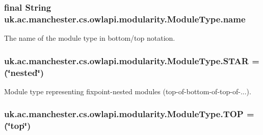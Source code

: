 \hypertarget{enumuk_1_1ac_1_1manchester_1_1cs_1_1owlapi_1_1modularity_1_1_module_type_a44198db5f341f357b3d0011c09abb6b6}{
\subsubsection[{name}]{\setlength{\rightskip}{0pt plus 5cm}final String uk.\-ac.\-manchester.\-cs.\-owlapi.\-modularity.\-Module\-Type.\-name\hspace{0.3cm}{\ttfamily [private]}}}\label{enumuk_1_1ac_1_1manchester_1_1cs_1_1owlapi_1_1modularity_1_1_module_type_a44198db5f341f357b3d0011c09abb6b6}
The name of the module type in bottom/top notation. \hypertarget{enumuk_1_1ac_1_1manchester_1_1cs_1_1owlapi_1_1modularity_1_1_module_type_a2bb705a4bb506642d6278fcbd3a2c3a4}{
\subsubsection[{S\-T\-A\-R}]{\setlength{\rightskip}{0pt plus 5cm}uk.\-ac.\-manchester.\-cs.\-owlapi.\-modularity.\-Module\-Type.\-S\-T\-A\-R =(\char`\"{}nested\char`\"{})}}\label{enumuk_1_1ac_1_1manchester_1_1cs_1_1owlapi_1_1modularity_1_1_module_type_a2bb705a4bb506642d6278fcbd3a2c3a4}
Module type representing fixpoint-\/nested modules (top-\/of-\/bottom-\/of-\/top-\/of-\/...). \hypertarget{enumuk_1_1ac_1_1manchester_1_1cs_1_1owlapi_1_1modularity_1_1_module_type_a7fcf11e90c5fa0c38ba7481f7d1f92cc}{
\subsubsection[{T\-O\-P}]{\setlength{\rightskip}{0pt plus 5cm}uk.\-ac.\-manchester.\-cs.\-owlapi.\-modularity.\-Module\-Type.\-T\-O\-P =(\char`\"{}top\char`\"{})}}\label{enumuk_1_1ac_1_1manchester_1_1cs_1_1owlapi_1_1modularity_1_1_module_type_a7fcf11e90c5fa0c38ba7481f7d1f92cc}
